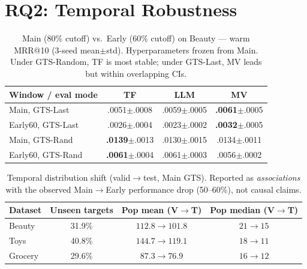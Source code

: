 \documentclass[sigconf,natbib=true,anonymous]{acmart}
\begin{document}
\section{RQ2: Temporal Robustness}
\label{sec:rq2}

\begin{table}[t]
\centering
\caption{%
Main ($80\%$ cutoff) vs.\ Early ($60\%$ cutoff) on Beauty --- warm MRR@10 (3-seed mean$\pm$std).
Hyperparameters frozen from Main.
Under GTS-Random, TF is most stable; under GTS-Last, MV leads but within overlapping CIs.%
}
\label{tab:early}
\small
\begin{tabular}{@{}lccc@{}}
\toprule
Window / eval mode & TF & LLM & MV \\
\midrule
Main, GTS-Last    & .0051\tiny{$\pm$.0008} & .0059\tiny{$\pm$.0005} & \textbf{.0061}\tiny{$\pm$.0005} \\
Early60, GTS-Last & .0026\tiny{$\pm$.0004} & .0023\tiny{$\pm$.0002} & \textbf{.0032}\tiny{$\pm$.0005} \\
\midrule
Main, GTS-Rand    & \textbf{.0139}\tiny{$\pm$.0013} & .0130\tiny{$\pm$.0015} & .0134\tiny{$\pm$.0011} \\
Early60, GTS-Rand & \textbf{.0061}\tiny{$\pm$.0004} & .0061\tiny{$\pm$.0003} & .0056\tiny{$\pm$.0002} \\
\bottomrule
\end{tabular}
\end{table}

\begin{table}[t]
\centering
\caption{%
Temporal distribution shift (valid$\to$test, Main GTS).
Reported as \emph{associations} with the observed Main$\to$Early performance drop (50--60\%), not causal claims.%
}
\label{tab:shift}
\small
\setlength{\tabcolsep}{4pt}
\begin{tabular}{@{}lccc@{}}
\toprule
Dataset & Unseen targets & Pop mean (V$\to$T) & Pop median (V$\to$T) \\
\midrule
Beauty  & 31.9\% & $112.8 \to 101.8$ & $21 \to 15$ \\
Toys    & 40.8\% & $144.7 \to 119.1$ & $18 \to 11$ \\
Grocery & 29.6\% & $87.3 \to 76.9$ & $16 \to 12$ \\
\bottomrule
\end{tabular}
\end{table}
\end{document}
